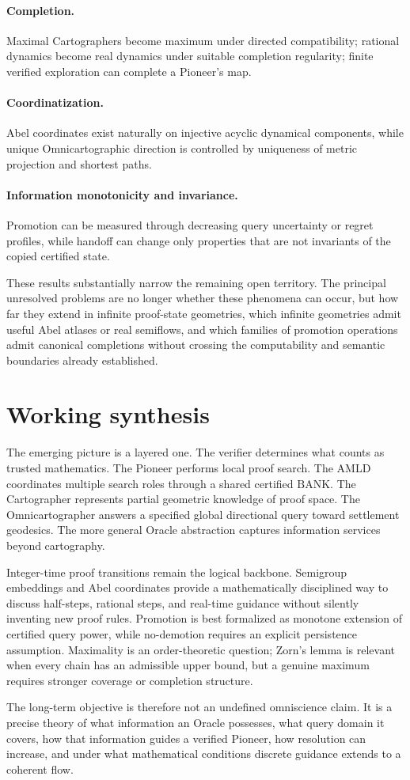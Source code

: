 \documentclass[11pt]{article}
\newcommand{\BANK}{\mathrm{BANK}}
\begin{document}
\paragraph{Completion.}
Maximal Cartographers become maximum under directed compatibility; rational dynamics become real dynamics under suitable completion regularity; finite verified exploration can complete a Pioneer's map.

\paragraph{Coordinatization.}
Abel coordinates exist naturally on injective acyclic dynamical components, while unique Omnicartographic direction is controlled by uniqueness of metric projection and shortest paths.

\paragraph{Information monotonicity and invariance.}
Promotion can be measured through decreasing query uncertainty or regret profiles, while handoff can change only properties that are not invariants of the copied certified state.

These results substantially narrow the remaining open territory. The principal unresolved problems are no longer whether these phenomena can occur, but how far they extend in infinite proof-state geometries, which infinite geometries admit useful Abel atlases or real semiflows, and which families of promotion operations admit canonical completions without crossing the computability and semantic boundaries already established.

\section{Working synthesis}
The emerging picture is a layered one. The verifier determines what counts as trusted mathematics. The Pioneer performs local proof search. The AMLD coordinates multiple search roles through a shared certified $\BANK$. The Cartographer represents partial geometric knowledge of proof space. The Omnicartographer answers a specified global directional query toward settlement geodesics. The more general Oracle abstraction captures information services beyond cartography.

Integer-time proof transitions remain the logical backbone. Semigroup embeddings and Abel coordinates provide a mathematically disciplined way to discuss half-steps, rational steps, and real-time guidance without silently inventing new proof rules. Promotion is best formalized as monotone extension of certified query power, while no-demotion requires an explicit persistence assumption. Maximality is an order-theoretic question; Zorn's lemma is relevant when every chain has an admissible upper bound, but a genuine maximum requires stronger coverage or completion structure.

The long-term objective is therefore not an undefined omniscience claim. It is a precise theory of what information an Oracle possesses, what query domain it covers, how that information guides a verified Pioneer, how resolution can increase, and under what mathematical conditions discrete guidance extends to a coherent flow.
\end{document}
